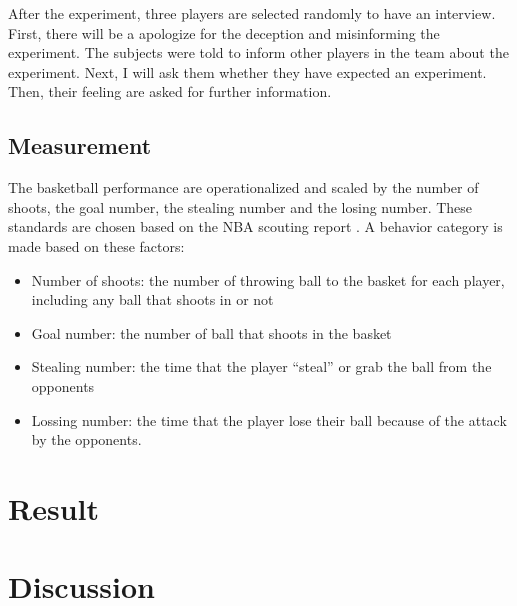 \documentclass{article}
\begin{document}
After the experiment, three players are selected randomly to have an interview. First, there will be a apologize for the deception and misinforming the experiment. The subjects were told to inform other players in the team about the experiment. Next, I will ask them whether they have expected an experiment. Then, their feeling are asked for further information.

\subsection{Measurement}
The basketball performance are operationalized and scaled by the number of shoots, the goal number, the stealing number and the losing number. These standards are chosen based on the NBA scouting report \autocite{NBAZhongGuoGuanFangWangZhanQiuYuanZiLiao}. A behavior category is made based on these factors:

\begin{itemize}
\item Number of shoots: the number of throwing ball to the basket for each player, including any ball that shoots in or not
\item Goal number: the number of ball that shoots in the basket
\item Stealing number: the time that the player “steal” or grab the ball from the opponents
\item Lossing number: the time that the player lose their ball because of the attack by the opponents.
\end{itemize}




\section{Result}

\section{Discussion}

\newpage
\printbibliography{}
\end{document}
